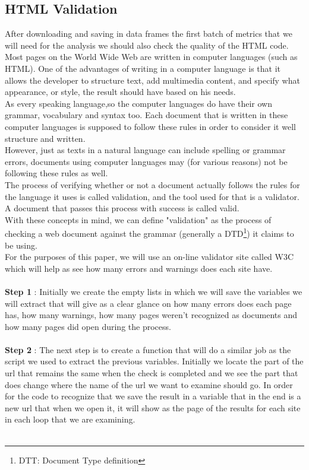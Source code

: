 \documentclass{book}
\begin{document}
\subsection{HTML Validation}
After downloading and saving in data frames the first batch of metrics that we will need for the analysis we should also check the quality of the HTML code.\\
Most pages on the World Wide Web are written in computer languages (such as HTML). One of the advantages of writing in a computer language is that it allows the developer to structure text, add multimedia content, and specify what appearance, or style, the result should have based on his needs.\\
As every speaking language,so the computer languages do have their own grammar, vocabulary and syntax too. Each document that is written in these computer languages is supposed to follow these rules in order to consider it well structure and written.\\
However, just as texts in a natural language can include spelling or grammar errors, documents using computer languages may (for various reasons) not be following these rules as well.\\
The process of verifying whether or not a document actually follows the rules for the language it uses is called validation, and the tool used for that is a validator. A document that passes this process with success is called valid.\\
With these concepts in mind, we can define "validation" as the process of checking a web document against the grammar (generally a DTD\footnote{DTT: Document Type definition}) it claims to be using.\\
For the purposes of this paper, we will use an on-line validator site called W3C\cite{key50} which will help as see how many errors and warnings does each site have. \\\\
\textbf{Step 1} : Initially we create the empty lists in which we will save the variables we will extract that will give as a clear glance on how many errors does each page has, how many warnings, how many pages weren't recognized as documents and how many pages did open during the process.\\\\
\textbf{Step 2} : The next step is to create a function that will do a similar job as the script we used to extract the previous variables. Initially we locate the part of the url that remains the same when the check is completed and we see the part that does change where the name of the url we want to examine should go. In order for the code to recognize that we save the result in a variable that in the end is a new url that when we open it, it will show as the page of the results for each site in each loop that we are examining.\\\\
\end{document}
